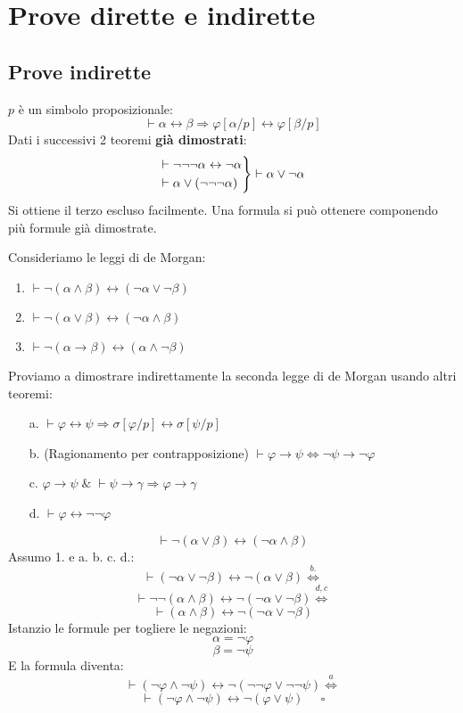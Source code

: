\documentclass{article}
\theoremstyle{break}
\theoremstyle{break}
\theoremstyle{break}
\theoremstyle{break}
\begin{document}
\section{Prove dirette e indirette}
\subsection{Prove indirette}
\( p \) è un simbolo proposizionale:
\[
  \vdash \alpha \leftrightarrow \beta \Rightarrow \varphi[\alpha/p] \leftrightarrow \varphi[\beta/p]
\] 
Dati i successivi 2 teoremi \textbf{già dimostrati}:
\[
  \begin{rcases}
    \vdash \neg \neg \neg \alpha \leftrightarrow \neg \alpha \\
    \vdash \alpha \vee (\neg \neg \neg \alpha)
  \end{rcases} \vdash \alpha \vee \neg \alpha
\] 
Si ottiene il terzo escluso facilmente.
Una formula si può ottenere componendo più formule già dimostrate.

Consideriamo le leggi di de Morgan:
\begin{enumerate}
  \item \( \vdash \neg(\alpha \wedge \beta) \leftrightarrow (\neg \alpha \vee \neg \beta) \) 
  \item \( \vdash \neg (\alpha \vee \beta) \leftrightarrow (\neg \alpha \wedge \beta) \) 
  \item \( \vdash \neg (\alpha \to \beta) \leftrightarrow (\alpha \wedge \neg \beta) \) 
\end{enumerate}
Proviamo a dimostrare indirettamente la seconda legge di de Morgan usando altri teoremi:
\begin{enumerate}
  \item[a.] \( \vdash \varphi \leftrightarrow \psi \Rightarrow \sigma[\varphi/p] \leftrightarrow \sigma[\psi/p] \) 
  \item[b.] (Ragionamento per contrapposizione) \( \vdash \varphi \to \psi \Leftrightarrow \neg \psi \to \neg \varphi\) 
  \item[c.] \( \varphi \to \psi\; \& \; \vdash \psi \to \gamma \Rightarrow \varphi \to \gamma \)
  \item[d.] \( \vdash \varphi \leftrightarrow \neg \neg \varphi \) 
\end{enumerate}
\begin{example}
  \[
    \vdash \neg (\alpha \vee \beta) \leftrightarrow (\neg \alpha \wedge \beta)
  \]  
  Assumo 1. e a. b. c. d.:
  \[
    \vdash (\neg \alpha \vee \neg \beta) \leftrightarrow \neg (\alpha \vee \beta) \stackrel{b.}{\Leftrightarrow}
  \] 
  \[
    \vdash \neg \neg (\alpha \wedge \beta) \leftrightarrow \neg (\neg \alpha \vee \neg \beta) \stackrel{d, c}{\Leftrightarrow}
  \] 
  \[
    \vdash   (\alpha \wedge \beta) \leftrightarrow \neg (\neg \alpha \vee \neg \beta)
  \] 
  Istanzio le formule per togliere le negazioni:
  \[
    \alpha = \neg \varphi
  \] 
  \[
    \beta = \neg \psi
  \] 
  E la formula diventa:
  \[
    \vdash (\neg \varphi \wedge \neg \psi) \leftrightarrow \neg(\neg \neg \varphi \vee \neg \neg \psi) \stackrel{a}{\Leftrightarrow}
  \] 
  \[
    \vdash (\neg \varphi \wedge \neg \psi) \leftrightarrow \neg(\varphi \vee \psi)\;\;\;\;\; \square
  \] 
\end{example}
\end{document}

